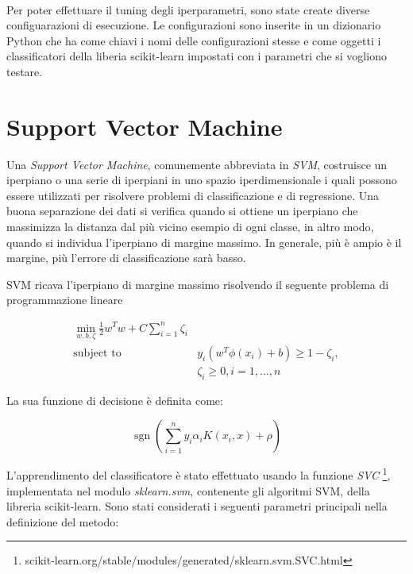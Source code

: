 \documentclass[12pt,a4paper,oneside,hidelinks]{report}
\DeclareMathOperator*{\sgn}{sgn}
\begin{document}
\paragraph*{}
Per poter effettuare il tuning degli iperparametri, sono state create diverse configuarazioni di esecuzione.
Le configurazioni sono inserite in un dizionario Python che ha come chiavi i nomi delle configurazioni stesse e come oggetti i classificatori della liberia scikit-learn impostati con i parametri che si vogliono testare.


\section{Support Vector Machine}
Una \textit{Support Vector Machine}, comunemente abbreviata in \textit{SVM}, costruisce un iperpiano o una serie di iperpiani in uno spazio iperdimensionale i quali possono essere utilizzati per risolvere problemi di classificazione e di regressione. Una buona separazione dei dati si verifica quando si ottiene un iperpiano che massimizza la distanza dal più vicino esempio di ogni classe, in altro modo, quando si individua l'iperpiano di margine massimo. In generale, più è ampio è il margine, più l'errore di classificazione sarà basso.

SVM ricava l'iperpiano di margine massimo risolvendo il seguente problema di programmazione lineare

\begin{equation} \label{uno}
\begin{split}
\min_ {w, b, \zeta} \frac{1}{2} w^T w + C \sum_{i=1}^{n} \zeta_i \\
\textrm {subject to } & y_i (w^T \phi (x_i) + b) \geq 1 - \zeta_i, \\
& \zeta_i \geq 0, i=1, \dotsc ,n
\end{split}
\end{equation}

La sua funzione di decisione è definita come:

\begin{equation} \label{due}
\sgn(\sum_{i=1}^n y_i \alpha_i K(x_i, x) + \rho)
\end{equation}

L'apprendimento del classificatore è stato effettuato usando la funzione \textit{SVC} \footnote{scikit-learn.org/stable/modules/generated/sklearn.svm.SVC.html}, implementata nel modulo \textit{sklearn.svm}, contenente gli algoritmi SVM, della libreria scikit-learn. Sono stati considerati i seguenti parametri principali nella definizione del metodo:
\end{document}
